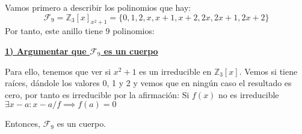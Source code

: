 \documentclass[11pt, a4paper, titlepage]{article}
\providecommand{\ent}{\mathbb{Z}}
\begin{document}

Vamos primero a describir los polinomios que hay:
\[
\mathcal{F}_9 =\ent_3[x]_{x^2+1}= \{0,1,2,x,x+1,x+2,2x,2x+1,2x+2\}
\]
Por tanto, este anillo tiene 9 polinomios:

\underline{\textbf{1) Argumentar que $\mathcal{F}_9$ es un cuerpo}}

Para ello, tenemos que ver si $x^2+1$ es un irreducible en $\ent_3[x]$. Vemos si tiene raíces, dándole los valores 0, 1 y 2 y vemos que en ningún caso el resultado es cero, por tanto es irreducible por la afirmación: Si $f(x)$ no es irreducible $\exists x-a : x-a/f \implies f(a) = 0$

Entonces, $\mathcal{F}_9$ es un cuerpo.
\end{document}

